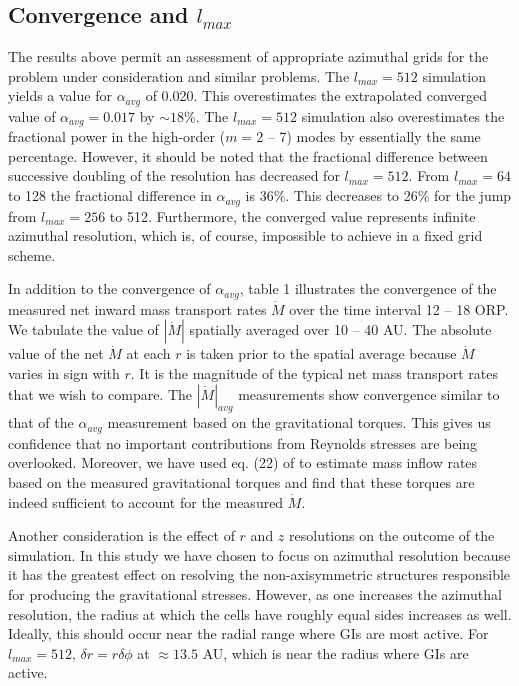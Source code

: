 \documentclass[manuscript]{aastex}
\begin{document}
\subsection{Convergence and $l_{max}$}

The results above permit an assessment of appropriate azimuthal grids for the problem under consideration and
similar problems. The $l_{max} = 512$ simulation yields a value for $\alpha_{avg}$ of 0.020. This
overestimates the extrapolated converged value of $\alpha_{avg} = 0.017$ by $\sim 18$\%. The $l_{max} = 512$
simulation also overestimates the fractional power in the high-order ($m = 2$ -- 7) modes by essentially the
same percentage. However, it should be noted that the fractional difference between successive doubling of the
resolution has decreased for $l_{max} = 512$. From $l_{max} =64$ to 128 the fractional difference in
$\alpha_{avg}$ is 36\%. This decreases to 26\% for the jump from $l_{max} = 256$ to 512. Furthermore, the
converged value represents infinite azimuthal resolution, which is, of course, impossible to achieve in a
fixed grid scheme.

In addition to the convergence of $\alpha_{avg}$, table 1 illustrates the convergence of the measured net
inward mass transport rates $\dot{M}$ over the time interval 12 -- 18 ORP. We tabulate the value of
$|\dot{M}|$ spatially averaged over 10 -- 40 AU. The absolute value of the net $\dot{M}$ at each $r$ is taken
prior to the spatial average because $\dot{M}$ varies in sign with $r$. It is the magnitude of the typical net
mass transport rates that we wish to compare. The $|\dot{M}|_{avg}$ measurements show convergence similar to
that of the $\alpha_{avg}$ measurement based on the gravitational torques. This gives us confidence that no
important contributions from Reynolds stresses are being overlooked. Moreover, we have used eq. (22) of
\citet{boley2006} to estimate mass inflow rates based on the measured gravitational torques and find that
these torques are indeed sufficient to account for the measured $\dot{M}$.

Another consideration is the effect of $r$ and $z$ resolutions on the outcome of the simulation. In this study we have chosen to focus on azimuthal resolution because it has the greatest effect on resolving the non-axisymmetric
structures responsible for producing the gravitational stresses. However, as one increases the azimuthal resolution, the radius at which the cells have roughly equal sides increases as well. Ideally, this should occur near the radial range where GIs are most active. For $l_{max} = 512$, $\delta r = r \delta \phi $ at $\approx 13.5$ AU, which is near the radius where GIs are active.
\end{document}

